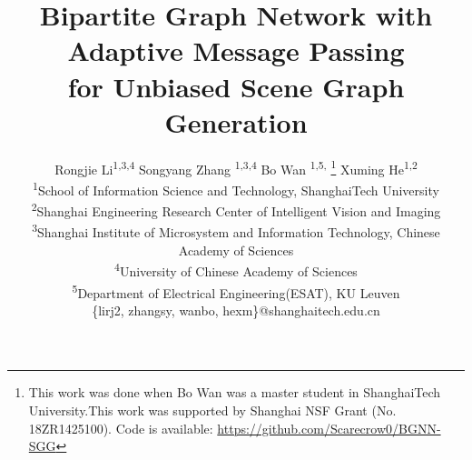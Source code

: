 \documentclass[final]{cvpr}
\begin{document}
\title{Bipartite Graph Network with Adaptive Message Passing \\ 
for Unbiased Scene Graph Generation}


\author{Rongjie Li\textsuperscript{\rm 1,3,4}
	\quad Songyang Zhang \textsuperscript{\rm 1,3,4}
   \quad Bo Wan \textsuperscript{\rm 1,5,} \thanks{This work was done when Bo Wan was a master student in ShanghaiTech University.This work was supported by Shanghai NSF Grant (No. 18ZR1425100). 
   Code is available: \url{https://github.com/Scarecrow0/BGNN-SGG} }
	\quad Xuming He\textsuperscript{\rm 1,2} \\
	\textsuperscript{\rm 1}School of Information Science and Technology, ShanghaiTech University \quad \\
	\textsuperscript{\rm 2}Shanghai Engineering Research Center of Intelligent Vision and Imaging\\
	\textsuperscript{\rm 3}Shanghai Institute of Microsystem and Information Technology,
	Chinese Academy of Sciences\\
	\textsuperscript{\rm 4}University of Chinese Academy of Sciences\\
	\textsuperscript{\rm 5}Department of Electrical Engineering(ESAT), KU Leuven\\
	\{lirj2, zhangsy, wanbo, hexm\}@shanghaitech.edu.cn
}

\maketitle
\end{document}
